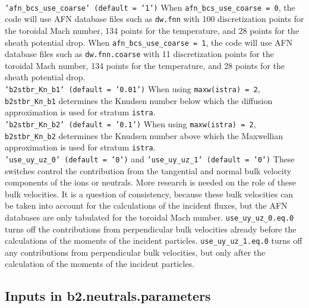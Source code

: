\\
{\tt 'afn\_bcs\_use\_coarse' (default = '1')} \newline
When {\tt afn\_bcs\_use\_coarse = 0}, the code will use AFN database files such as {\tt dw.fnn} with 100 discretization points for the toroidal Mach number, 134 points for the temperature, and 28 points for the sheath potential drop. When {\tt afn\_bcs\_use\_coarse = 1}, the code will use AFN database files such as {\tt dw.fnn.coarse} with 11 discretization points for the toroidal Mach number, 134 points for the temperature, and 28 points for the sheath potential drop. \newline
\\
{\tt 'b2stbr\_Kn\_b1' (default = '0.01')} \newline
When using {\tt maxw(istra) = 2}, {\tt b2stbr\_Kn\_b1} determines the Knudsen number below which the diffusion approximation is used for stratum {\tt istra}. \newline
\\
{\tt 'b2stbr\_Kn\_b2' (default = '0.1')} \newline
When using {\tt maxw(istra) = 2}, {\tt b2stbr\_Kn\_b2} determines the Knudsen number above which the Maxwellian approximation is used for stratum {\tt istra}. \newline
\\
{\tt 'use\_uy\_uz\_0' (default = '0')} and {\tt 'use\_uy\_uz\_1' (default = '0')} \newline
These switches control the contribution from the tangential and normal bulk velocity components of the ions or neutrals. More research is needed on the role of these bulk velocities. It is a question of consistency, because these bulk velocities can be taken into account for the calculations of the incident fluxes, but the AFN databases are only tabulated for the toroidal Mach number.
{\tt use\_uy\_uz\_0.eq.0} turns off the contributions from perpendicular bulk velocities already before the calculations of the moments of the incident particles. {\tt use\_uy\_uz\_1.eq.0} turns off any contributions from perpendicular bulk velocities, but only after the calculation of the moments of the incident particles. \newline

 \subsection{Inputs in b2.neutrals.parameters}

